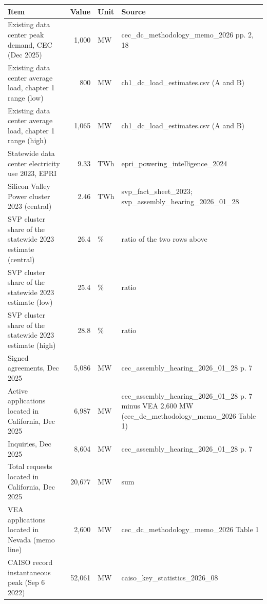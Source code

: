 \begin{tabular}{p{6.2cm}rlp{7.2cm}}
\toprule
Item & Value & Unit & Source \\
\midrule
Existing data center peak demand, CEC (Dec 2025) & 1,000 & MW & cec\_\allowbreak{}dc\_\allowbreak{}methodology\_\allowbreak{}memo\_\allowbreak{}2026 pp. 2, 18 \\
Existing data center average load, chapter 1 range (low) & 800 & MW & ch1\_\allowbreak{}dc\_\allowbreak{}load\_\allowbreak{}estimates.csv (A and B) \\
Existing data center average load, chapter 1 range (high) & 1,065 & MW & ch1\_\allowbreak{}dc\_\allowbreak{}load\_\allowbreak{}estimates.csv (A and B) \\
Statewide data center electricity use 2023, EPRI & 9.33 & TWh & epri\_\allowbreak{}powering\_\allowbreak{}intelligence\_\allowbreak{}2024 \\
Silicon Valley Power cluster 2023 (central) & 2.46 & TWh & svp\_\allowbreak{}fact\_\allowbreak{}sheet\_\allowbreak{}2023; svp\_\allowbreak{}assembly\_\allowbreak{}hearing\_\allowbreak{}2026\_\allowbreak{}01\_\allowbreak{}28 \\
SVP cluster share of the statewide 2023 estimate (central) & 26.4 & \% & ratio of the two rows above \\
SVP cluster share of the statewide 2023 estimate (low) & 25.4 & \% & ratio \\
SVP cluster share of the statewide 2023 estimate (high) & 28.8 & \% & ratio \\
Signed agreements, Dec 2025 & 5,086 & MW & cec\_\allowbreak{}assembly\_\allowbreak{}hearing\_\allowbreak{}2026\_\allowbreak{}01\_\allowbreak{}28 p. 7 \\
Active applications located in California, Dec 2025 & 6,987 & MW & cec\_\allowbreak{}assembly\_\allowbreak{}hearing\_\allowbreak{}2026\_\allowbreak{}01\_\allowbreak{}28 p. 7 minus VEA 2,600 MW (cec\_\allowbreak{}dc\_\allowbreak{}methodology\_\allowbreak{}memo\_\allowbreak{}2026 Table 1) \\
Inquiries, Dec 2025 & 8,604 & MW & cec\_\allowbreak{}assembly\_\allowbreak{}hearing\_\allowbreak{}2026\_\allowbreak{}01\_\allowbreak{}28 p. 7 \\
Total requests located in California, Dec 2025 & 20,677 & MW & sum \\
VEA applications located in Nevada (memo line) & 2,600 & MW & cec\_\allowbreak{}dc\_\allowbreak{}methodology\_\allowbreak{}memo\_\allowbreak{}2026 Table 1 \\
CAISO record instantaneous peak (Sep 6 2022) & 52,061 & MW & caiso\_\allowbreak{}key\_\allowbreak{}statistics\_\allowbreak{}2026\_\allowbreak{}08 \\

\end{tabular}
